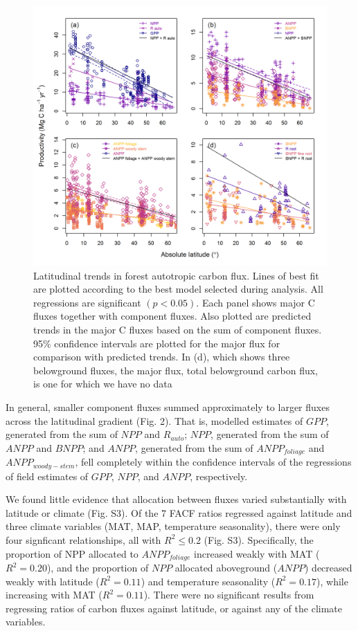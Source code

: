 \documentclass[]{article}
\begin{document}
\begin{figure}[H]
\includegraphics[width=1\linewidth]{combined_stacked} \caption{Latitudinal trends in forest autotropic carbon flux. Lines of best fit are plotted according to the best model selected during analysis. All regressions are significant $(p<0.05)$. Each panel shows major C fluxes together with component fluxes. Also plotted are predicted trends in the major C fluxes based on the sum of component fluxes. 95\% confidence intervals are plotted for the major flux for comparison with predicted trends. In (d),  which shows three belowground fluxes, the major flux, total belowground carbon flux, is one for which we have no data}\label{fig:unnamed-chunk-7}
\end{figure}

In general, smaller component fluxes summed approximately to larger
fluxes across the latitudinal gradient (Fig. 2). That is, modelled
estimates of \(GPP\), generated from the sum of \(NPP\) and
\(R_{auto}\); \(NPP\), generated from the sum of \(ANPP\) and \(BNPP\);
and \(ANPP\), generated from the sum of \(ANPP_{foliage}\) and
\(ANPP_{woody-stem}\), fell completely within the confidence intervals
of the regressions of field estimates of \(GPP\), \(NPP\), and \(ANPP\),
respectively.

We found little evidence that allocation between fluxes varied
substantially with latitude or climate (Fig. S3). Of the 7 FACF ratios
regressed against latitude and three climate variables (MAT, MAP,
temperature seasonality), there were only four signficant relationships,
all with \(R^2 \le 0.2\) (Fig. S3). Specifically, the proportion of NPP
allocated to \(ANPP_{foliage}\) increased weakly with MAT
(\(R^2=0.20\)), and the proportion of \(NPP\) allocated aboveground
(\(ANPP\)) decreased weakly with latitude (\(R^2=0.11\)) and temperature
seasonality (\(R^2=0.17\)), while increasing with MAT (\(R^2=0.11\)).
There were no significant results from regressing ratios of carbon
fluxes against latitude, or against any of the climate variables.
\end{document}
